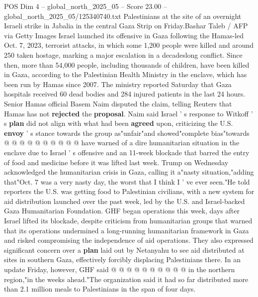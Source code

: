 \begin{textsample}{POS Dim 4 – global\_north\_2025\_05 – Score 23.00 – global\_north\_2025\_05/125340740.txt}
Palestinians at the site of an overnight Israeli strike in Jabalia in the central Gaza Strip on Friday.Bashar Taleb / AFP via Getty Images Israel launched its offensive in Gaza following the Hamas-led Oct. 7, 2023, terrorist attacks, in which some 1,200 people were killed and around 250 taken hostage, marking a major escalation in a decadeslong conflict.
Since then, more than 54,000 people, including thousands of children, have been killed in Gaza, according to the Palestinian Health Ministry in the enclave, which has been run by Hamas since 2007.
The ministry reported Saturday that Gaza hospitals received 60 dead bodies and 284 injured patients in the last 24 hours.
Senior Hamas official Basem Naim disputed the claim, telling Reuters that Hamas has not \textbf{rejected} the \textbf{proposal}.
Naim said Israel ' s response to Witkoff ' s \textbf{plan} did not align with what had been \textbf{agreed} upon, criticizing the U.S. \textbf{envoy} ' s stance towards the group as"unfair"and showed"complete bias"towards @ @ @ @ @ @ @ @ @ @ have warned of a dire humanitarian situation in the enclave due to Israel ' s offensive and an 11-week blockade that barred the entry of food and medicine before it was lifted last week.
Trump on Wednesday acknowledged the humanitarian crisis in Gaza, calling it a"nasty situation,"adding that"Oct. 7 was a very nasty day, the worst that I think I ' ve ever seen."He told reporters the U.S. was getting food to Palestinian civilians, with a new system for aid distribution launched over the past week, led by the U.S. and Israel-backed Gaza Humanitarian Foundation.
GHF began operations this week, days after Israel lifted its blockade, despite criticism from humanitarian groups that warned that its operations undermined a long-running humanitarian framework in Gaza and risked compromising the independence of aid operations.
They also expressed significant concern over a \textbf{plan} laid out by Netanyahu to see aid distributed at sites in southern Gaza, effectively forcibly displacing Palestinians there.
In an update Friday, however, GHF said @ @ @ @ @ @ @ @ @ @ in the northern region,"in the weeks ahead."The organization said it had so far distributed more than 2.1 million meals to Palestinians in the span of four days.

\end{textsample}
